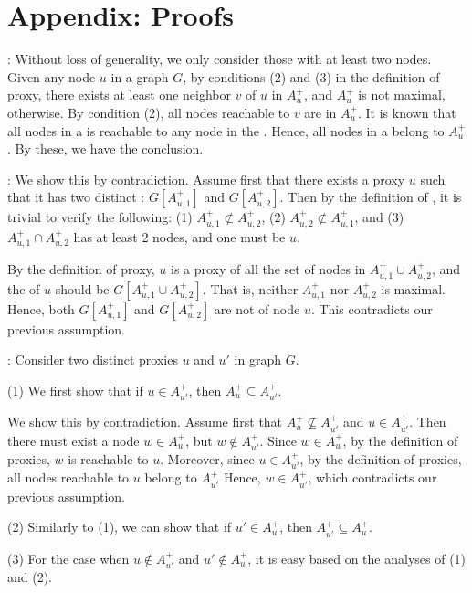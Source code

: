 \section*{Appendix: Proofs}
\label{sec-proofs}
:
Without loss of generality, we only consider those \ccs with at least two nodes.
Given any node $u$ in a graph $G$, by conditions (2) and (3) in the definition of proxy, there exists at least one neighbor $v$ of $u$ in $A^+_u$, and $A^+_u$ is not maximal, otherwise. By condition (2), all nodes reachable to $v$ are in $A^+_u$. It is known that all nodes in a \cc is reachable to any node in the \cc.
Hence, all nodes in a \cc belong to $A^+_u$. By these, we have the conclusion.
\eop


:
We show this by contradiction. Assume first that there exists a proxy $u$ such that it has two distinct \dras: $G[A^+_{u,1}]$ and $G[A^+_{u,2}]$.
Then by the definition of \dra, it is trivial to verify the following:
%
\sstab(1) $A^+_{u,1}\not\subset A^+_{u,2}$,
\sstab(2) $A^+_{u,2}\not\subset A^+_{u,1}$, and
\sstab(3) $A^+_{u,1}\cap A^+_{u,2}$ has at least 2 nodes, and one must be $u$.

By the definition of proxy, $u$ is a proxy of all the set of nodes in $A^+_{u,1}\cup A^+_{u,2}$, and the \dra of $u$ should be $G[A^+_{u,1}\cup A^+_{u,2}]$. That is, neither $A^+_{u,1}$ nor $A^+_{u,2}$ is maximal. Hence, both $G[A^+_{u,1}]$ and $G[A^+_{u,2}]$ are not \dras of node $u$.
This contradicts our previous assumption.
\eop


:
Consider two distinct proxies $u$ and $u'$ in graph $G$.


(1) We first show that if $u\in A^+_{u'}$, then $A^+_{u}\subseteq A^+_{u'}$.

We show this by contradiction. Assume first that $A^+_{u}\not\subseteq A^+_{u'}$ and $u\in A^+_{u'}$.
Then there must exist a node $w\in A^+_{u}$, but $w\not\in A^+_{u'}$.
%
Since $w\in A^+_{u}$, by the definition of proxies, $w$ is reachable to $u$.
Moreover, since $u\in A^+_{u'}$, by the definition of proxies, all nodes reachable to $u$ belong to  $A^+_{u'}$
Hence, $w\in A^+_{u'}$, which contradicts our previous assumption.

(2) Similarly to (1), we can show that if $u'\in A^+_{u}$, then $A^+_{u'}\subseteq A^+_{u}$.

(3) For the case when $u\not\in A^+_{u'}$ and $u'\not\in A^+_{u}$, it is easy based on the analyses of (1) and (2).
\eop

